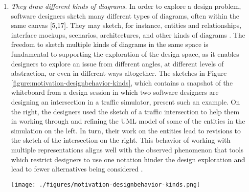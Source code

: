 \documentclass[12pt,fleqn]{ucithesis}
\begin{document}
\begin{enumerate}
\item \emph{They draw different kinds of diagrams.} In order to explore a design problem, software designers sketch many different types of diagrams, often within the same canvas [5,17]. They may sketch, for instance, entities and relationships, interface mockups, scenarios, architectures, and other kinds of diagrams \cite{cherubini2007let}. The freedom to sketch multiple kinds of diagrams in the same space is fundamental to supporting the exploration of the design space, as it enables designers to explore an issue from different angles, at different levels of abstraction, or even in different ways altogether. The sketches in Figure \ref{figure:motivation-designbehavior-kinds}, which contains a snapshot of the whiteboard from a design session in which two software designers are designing an intersection in a traffic simulator, present such an example. On the right, the designers used the sketch of a traffic intersection to help them in working through and refining the UML model of some of the entities in the simulation on the left. In turn, their work on the entities lead to revisions to the sketch of the intersection on the right. This behavior of working with multiple representations aligns well with the observed phenomenon that tools which restrict designers to use one notation hinder the design exploration and lead to fewer alternatives being considered \cite{shipman1999incremental}. 

\begin{figure*}[tbh]
  \centering
  \texttt{[image: ./figures/motivation-designbehavior-kinds.png]}
  \caption{Diagram from a design session that includes UML diagrams, a map, and annotations.}
  \label{figure:motivation-designbehavior-kinds}
\end{figure*} 



\end{enumerate}
\end{document}
